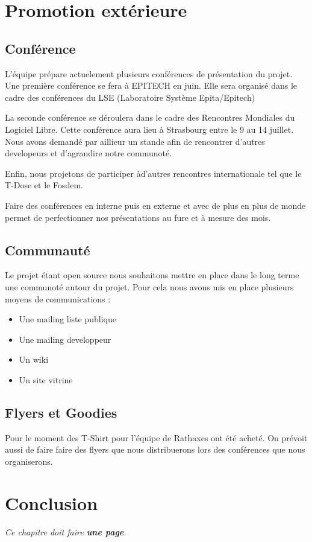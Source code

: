 \documentclass[francais]{rtxreport}
\begin{document}
\chapter{Promotion extérieure}



\section {Conférence}

L'équipe prépare actuelement plusieurs conférences de présentation du projet.
Une première conférence se fera à {EPITECH} en juin. Elle sera organisé dans le
cadre des conférences du LSE (Laboratoire Système Epita/Epitech)

La seconde conférence se déroulera dans le cadre des Rencontres Mondiales du
Logiciel Libre. Cette conférence aura lieu à Strasbourg entre le 9 au 14
juillet. Nous avons demandé par aillieur un stande afin de rencontrer d'autres developeurs et d'agrandire notre communoté.

Enfin, nous projetons de participer àd'autres rencontres internationale tel que
le T-Dose et le Fosdem.

Faire des conférences en interne puis en externe et avec de plus en plus
de monde permet de perfectionner nos présentations au fure et à mesure des mois.


\section {Communauté}

Le projet étant open source nous souhaitons mettre en place dans le long terme
une communoté autour du projet. 
Pour cela nous avons mis en place plusieurs moyens de communications :

\begin {itemize}
\item Une mailing liste publique 
\item Une mailing developpeur
\item Un wiki 
\item Un site vitrine
\end {itemize} 


\section {Flyers et Goodies}
Pour le moment des T-Shirt pour l'équipe de Rathaxes ont été acheté. On prévoit aussi de faire faire des flyers que nous distribuerons lors des conférences que nous organiserons.



\chapter{Conclusion}

\emph{Ce chapitre doit faire \textbf{une page}.}

\end{document}
